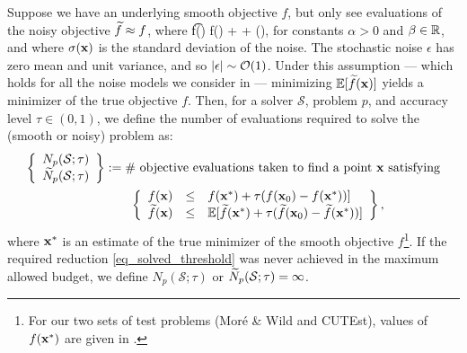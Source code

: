 Suppose we have an underlying smooth objective $f$, but only see evaluations of the noisy objective $\widetilde{f}\approx f$, where 
\be \t{f}(\bx)  \alpha f(\bx) + \beta + \sigma(\bx)\epsilon, \label{eq_noise_model_assumption} \ee
for constants $\alpha>0$ and $\beta\in\mathbb{R}$, and where $\sigma(\mathbf{x})$ is the standard deviation of the noise.
The stochastic noise $\epsilon$ has zero mean and unit variance, and so $|\epsilon|\sim\mathcal{O}(1)$.
Under this assumption --- which holds for all the noise models we consider in  --- minimizing $\mathbb{E}[\widetilde{f}(\mathbf{x})]$ yields a minimizer of the true objective $f$.
Then, for a solver $\mathcal{S}$, problem $p$, and accuracy level $\tau\in(0,1)$, we define the number of evaluations required to solve the (smooth or noisy) problem as:
\begin{align}
	\left\{\begin{array}{c}N_p(\mathcal{S}; \tau) \\ \widetilde{N}_p(\mathcal{S}; \tau)\end{array}\right\} &:= \text{\# objective evaluations taken to find a point $\mathbf{x}$ satisfying} \nonumber \\
	&\qquad \left\{\begin{array}{rcl} f(\mathbf{x}) &\leq & f(\mathbf{x}^*) + \tau(f(\mathbf{x}_0) - f(\mathbf{x}^*))] \\ \widetilde{f}(\mathbf{x}) &\leq & \mathbb{E}[\widetilde{f}(\mathbf{x}^*) + \tau(\widetilde{f}(\mathbf{x}_0) - \widetilde{f}(\mathbf{x}^*))] \end{array}\right\}, \label{eq_solved_threshold}
\end{align}
where $\mathbf{x}^*$ is an estimate of the true minimizer of the smooth objective $f$\footnote{For our two sets of test problems (Mor\'e \& Wild and CUTEst), values of $f(\mathbf{x}^*)$ are given in \cite{Cartis2017a}.}.
If the required reduction \eqref{eq_solved_threshold} was never achieved in the maximum allowed budget, we define $N_p(\mathcal{S}; \tau)$ or $\widetilde{N}_p(\mathcal{S}; \tau)=\infty$.

